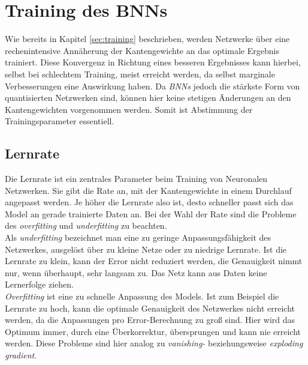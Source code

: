 \chapter{Training des BNNs}
Wie bereits in Kapitel \ref{sec:training} beschrieben, werden Netzwerke über eine rechenintensive Annäherung der Kantengewichte an das optimale Ergebnis trainiert. Diese Konvergenz in Richtung eines besseren Ergebnisses kann hierbei, selbst bei schlechtem Training, meist erreicht werden, da selbst marginale Verbesserungen eine Auswirkung haben. Da \textit{BNNs} jedoch die stärkste Form von quantisierten Netzwerken sind, können hier keine stetigen Änderungen an den Kantengewichten vorgenommen werden. Somit ist Abstimmung der Trainingsparameter essentiell.
\section{Lernrate}
Die Lernrate ist ein zentrales Parameter beim Training von Neuronalen Netzwerken. Sie gibt die Rate an, mit der Kantengewichte in einem Durchlauf angepasst werden. Je höher die Lernrate also ist, desto schneller passt sich das Model an gerade trainierte Daten an. Bei der Wahl der Rate sind die Probleme des \textit{overfitting} und \textit{underfitting} zu beachten.\\ 
Als \textit{underfitting} bezeichnet man eine zu geringe Anpassungsfähigkeit des Netzwerkes, ausgelöst über zu kleine Netze oder zu niedrige Lernrate. Ist die Lernrate zu klein, kann der Error nicht reduziert werden, die Genauigkeit nimmt nur, wenn überhaupt, sehr langsam zu. Das Netz kann aus Daten keine Lernerfolge ziehen.\\
\textit{Overfitting} ist eine zu schnelle Anpassung des Models. Ist zum Beispiel die Lernrate zu hoch, kann die optimale Genauigkeit des Netzwerkes nicht erreicht werden, da die Anpassungen pro Error-Berechnung zu groß sind. Hier wird das Optimum immer, durch eine Überkorrektur, übersprungen und kann nie erreicht werden\cite{smith2018}. Diese Probleme sind hier analog zu \textit{vanishing-} beziehungsweise \textit{exploding gradient}.

